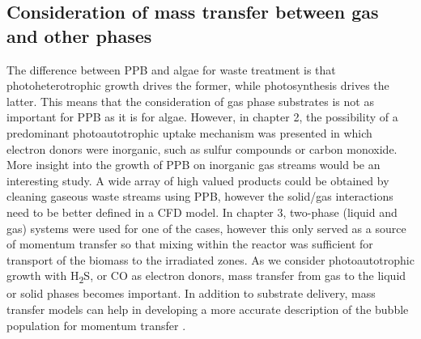 \subsection{Consideration of mass transfer between gas and other phases}
The difference between PPB and algae for waste treatment is that photoheterotrophic growth drives the former, while photosynthesis drives the latter. This means that the consideration of gas phase substrates is not as important for PPB as it is for algae. However, in chapter 2, the possibility of a predominant photoautotrophic uptake mechanism was presented in which electron donors were inorganic, such as sulfur compounds or carbon monoxide. More insight into the growth of PPB on inorganic gas streams would be an interesting study. A wide array of high valued products could be obtained by cleaning gaseous waste streams using PPB, however the solid/gas interactions need to be better defined in a CFD model. In chapter 3, two-phase (liquid and gas) systems were used for one of the cases, however this only served as a source of momentum transfer so that mixing within the reactor was sufficient for transport of the biomass to the irradiated zones. As we consider photoautotrophic growth with H\textsubscript{2}S, or CO as electron donors, mass transfer from gas to the liquid or solid phases becomes important. In addition to substrate delivery, mass transfer models can help in developing a more accurate description of the bubble population for momentum transfer \cite{krishna2003}.

